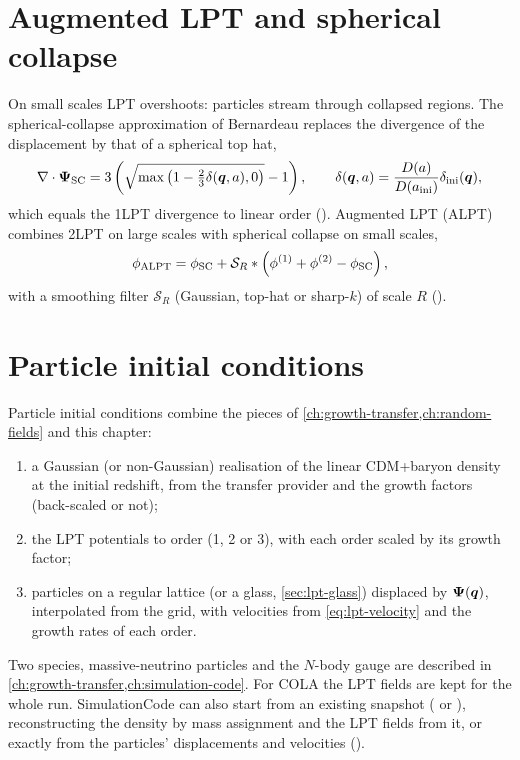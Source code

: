 \section{Augmented LPT and spherical collapse}\label{sec:lpt-alpt}

On small scales LPT overshoots: particles stream through collapsed regions. The spherical-collapse approximation of
Bernardeau \cite{Bernardeau1994} replaces the divergence of the displacement by that of a spherical top hat,
\begin{equation}
\nabla\cdot\bm\Psi_{\rm SC}=3\left(\sqrt{\max\left(1-\tfrac23\delta(\bm{q},a),0\right)}-1\right),\qquad
\delta(\bm{q},a)=\frac{D(a)}{D(a_{\rm ini})}\delta_{\rm ini}(\bm{q}),
\end{equation}
which equals the 1LPT divergence to linear order (). Augmented LPT (ALPT)
\cite{KitauraHess2013} combines 2LPT on large scales with spherical collapse on small scales,
\begin{equation}
\phi_{\rm ALPT}=\phi_{\rm SC}+\mathcal S_R*\left(\phi^{(1)}+\phi^{(2)}-\phi_{\rm SC}\right),
\end{equation}
with a smoothing filter $\mathcal S_R$ (Gaussian, top-hat or sharp-$k$) of scale $R$
().

\section{Particle initial conditions}\label{sec:lpt-ic}

Particle initial conditions combine the pieces of \cref{ch:growth-transfer,ch:random-fields} and this chapter:
\begin{enumerate}
\item a Gaussian (or non-Gaussian) realisation of the linear CDM+baryon density at the initial redshift, from the
      transfer provider and the growth factors (back-scaled or not);
\item the LPT potentials to order  (1, 2 or 3), with each order scaled by its growth factor;
\item particles on a regular lattice (or a glass, \cref{sec:lpt-glass}) displaced by $\bm\Psi(\bm{q})$, interpolated from
      the grid, with velocities from \cref{eq:lpt-velocity} and the growth rates of each order.
\end{enumerate}
Two species, massive-neutrino particles and the $N$-body gauge are described in \cref{ch:growth-transfer,ch:simulation-code}.
For COLA the LPT fields are kept for the whole run. SimulationCode can also start from an existing snapshot
( or ), reconstructing the density by mass assignment
and the LPT fields from it, or exactly from the particles' displacements and velocities
().

